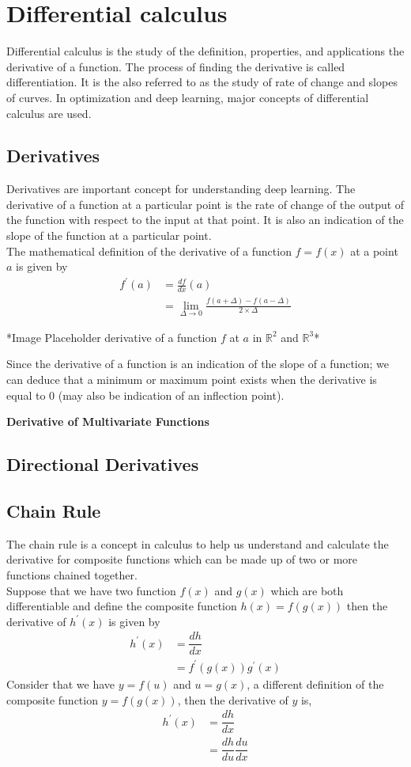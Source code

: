 \section{Differential calculus}
Differential calculus is the study of the definition, properties, and applications the derivative of a function. The process of finding the derivative is called differentiation. It is the also referred to as the study of rate of change and slopes of curves. In optimization and deep learning, major concepts of differential calculus are used.
\subsection{Derivatives}
Derivatives are important concept for understanding deep learning. The derivative of a function at a particular point is the rate of change of the output of the function with respect to the input at that point. It is also an indication of the slope of the function at a particular point.\\
The mathematical definition of the derivative of a function $f = f(x)$ at a point $a$ is given by
\begin{align}
  f^{'}(a) &= \frac{df}{d x}(a) \\ 
  &= \lim_{\Delta \rightarrow 0} \frac{f(a+\Delta) - f(a-\Delta)}{2 \times \Delta}
\end{align}
\begin{center}
  *Image Placeholder derivative of a function $f$ at $a$ in $\mathbb{R}^2$  and $\mathbb{R}^3$*    
\end{center}
Since the derivative of a function is an indication of the slope of a function; we can deduce that a minimum or maximum point exists when the derivative is equal to $0$ (may also be indication of an inflection point).

\vspace{5mm}
\noindent \textbf{Derivative of Multivariate Functions}
\subsection{Directional Derivatives}
\subsection{Chain Rule}
 The chain rule is a concept in calculus to help us understand and calculate the derivative for composite functions which can be made up of two or more functions chained together. \\
Suppose that we have two function $f(x)$ and $g(x)$ which are both differentiable and define the composite function $h(x) = f(g(x))$ then the derivative of $h^{'}(x)$ is given by
\begin{align}
  h^{'}(x) &= \dfrac{dh}{dx} \\
  &= f^{'}(g(x))g^{'}(x)
\end{align}
Consider that we  have $y=f(u)$ and $u=g(x)$, a different definition of the composite function $y=f(g(x))$, then the derivative of $y$ is,
\begin{align}
  h^{'}(x)  &= \dfrac{dh}{dx} \\
  &= \dfrac{dh}{du} \dfrac{du}{dx}
\end{align}
